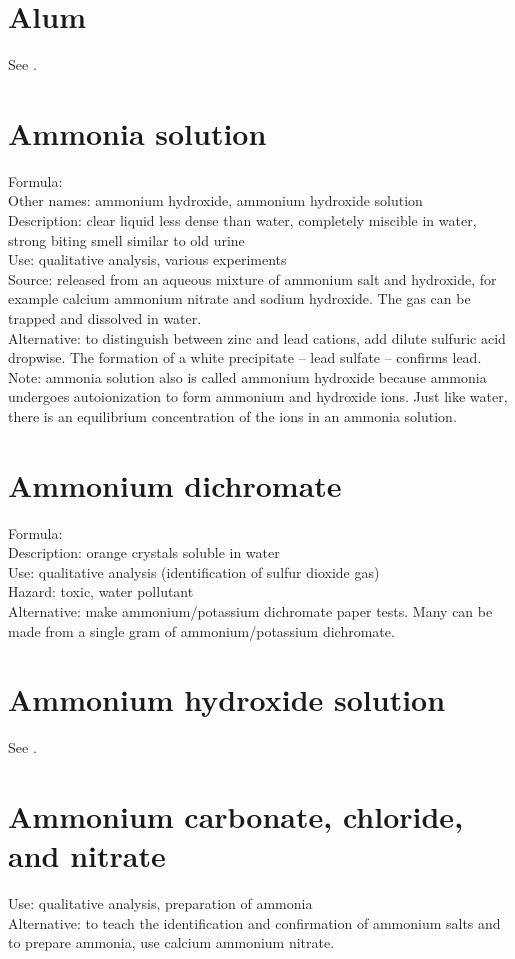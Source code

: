 \section{Alum}
See .

\section{Ammonia solution}
\label{sec:ammoniasol}
Formula: \\
Other names: ammonium hydroxide, 
ammonium hydroxide solution\\
Description: clear liquid less dense than water, 
completely miscible in water, 
strong biting smell similar to old urine\\
Use: qualitative analysis, various experiments\\
Source: released from an aqueous mixture of ammonium salt and hydroxide, 
for example calcium ammonium nitrate and sodium hydroxide. 
The gas can be trapped and dissolved in water.\\
Alternative: to distinguish between zinc and lead cations, 
add dilute sulfuric acid dropwise. 
The formation of a white precipitate -- lead sulfate -- confirms lead.
Note: ammonia solution also is called ammonium hydroxide 
because ammonia undergoes autoionization to form ammonium and hydroxide ions. 
Just like water, 
there is an equilibrium concentration of the ions in an ammonia solution.

\section{Ammonium dichromate}
Formula: \\
Description: orange crystals soluble in water\\
Use: qualitative analysis (identification of sulfur dioxide gas)\\
Hazard: toxic, 
water pollutant\\
Alternative: make ammonium/potassium dichromate paper tests. 
Many can be made from a single gram of ammonium/potassium dichromate.

\section{Ammonium hydroxide solution}
See .

\section{Ammonium carbonate, chloride, and nitrate}
Use: qualitative analysis, 
preparation of ammonia\\
Alternative: to teach the identification 
and confirmation of ammonium salts and to prepare ammonia, 
use calcium ammonium nitrate.

